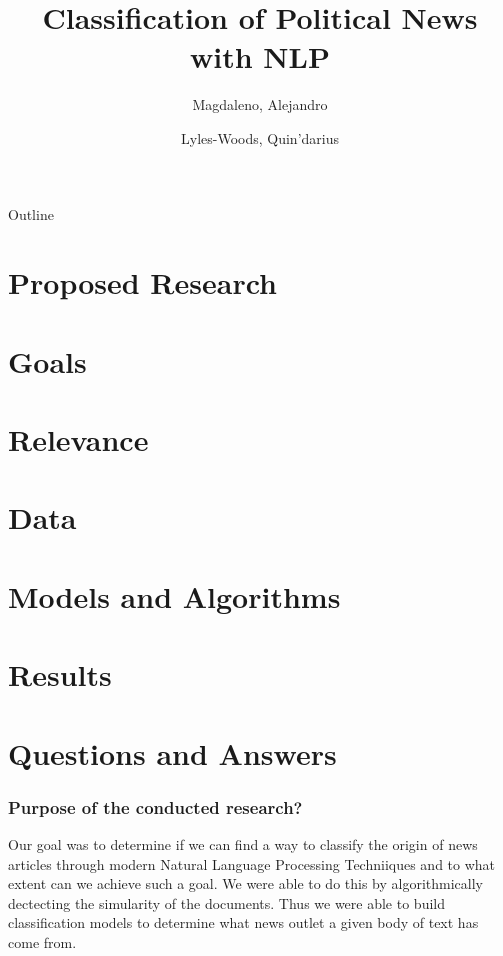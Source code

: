 \documentclass{beamer}
\title{Classification of Political News with NLP}
\author{
	Magdaleno, Alejandro\\
	\and
	Lyles-Woods, Quin'darius \\
}
\institute{Kennesaw State University}
\begin{document}
\frame{\titlepage}
\begin{frame}{Outline}
	\tableofcontents[currentsection]
\end{frame}
\section{Proposed Research}
\section{Goals}
\section{Relevance}
\section{Data}
\section{Models and Algorithms}
\section{Results}
\section{Questions and Answers}

\begin{frame}
	\frametitle{Purpose of the conducted research?}
	Our goal was to determine if we can find a way to classify the origin of news articles through modern Natural Language Processing Techniiques and to what extent can we achieve such a goal.
	We were able to do this by algorithmically dectecting the simularity of the documents.
	Thus we were able to build classification models to determine what news outlet a given body of text has come from.
\end{frame}
\end{document}
